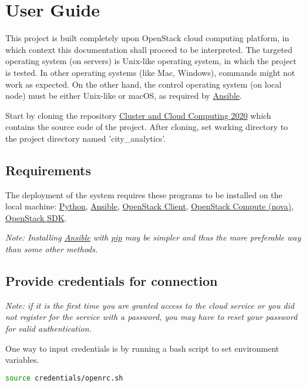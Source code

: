 \section{User Guide}
This project is built completely upon OpenStack cloud computing platform, in which context this documentation shall proceed to be interpreted. The targeted operating system (on servers) is Unix-like operating system, in which the project is tested. In other operating systems (like Mac, Windows), commands might not work as expected. On the other hand, the control operating system (on local node) must be either Unix-like or macOS, as required by \href{https://docs.ansible.com/ansible/latest/installation_guide/intro_installation.html}{Ansible}.  

Start by cloning the repository \href{https://github.com/nxv1987/UniMelb---Cluster-and-Cloud-Computing-COMP90024-2020-SM1}{Cluster and Cloud Computing 2020} which contains the source code of the project. After cloning, set working directory to the project directory named 'city\_analytics'.  

\subsection{Requirements}
The deployment of the system requires these programs to be installed on the local machine: \href{https://www.python.org/}{Python}, \href{https://docs.ansible.com/ansible/latest/installation_guide/intro_installation.html}{Ansible}, \href{https://docs.openstack.org/newton/user-guide/common/cli-install-openstack-command-line-clients.html}{OpenStack Client}, \href{https://docs.openstack.org/nova/latest/#installation}{OpenStack Compute (nova)}, \href{https://docs.openstack.org/openstacksdk/latest/user/}{OpenStack SDK}.  

\textit{Note: Installing \href{https://docs.ansible.com/ansible/latest/installation_guide/intro_installation.html}{Ansible} with \href{https://pip.pypa.io/en/stable/}{pip} may be simpler and thus the more preferable way than some other methods.}  

\subsection{Provide credentials for connection}
\textit{Note: if it is the first time you are granted access to the cloud service or you did not register for the service with
a password, you may have to reset your password for valid authentication.}  

One way to input credentials is by running a bash script to set environment variables.  
\begin{lstlisting}[language=bash]
source credentials/openrc.sh
\end{lstlisting}

